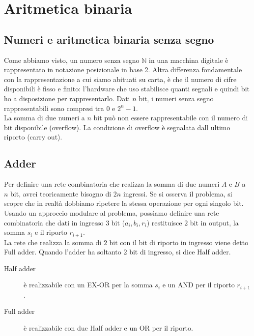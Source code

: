 \documentclass{article}
\begin{document}
\section{Aritmetica binaria}

\subsection{Numeri e aritmetica binaria senza segno}

Come abbiamo visto, un numero senza segno $\mathbb{N}$ in una macchina digitale è rappresentato in notazione posizionale in base 2.
Altra differenza fondamentale con la rappresentazione a cui siamo abituati su carta, è che il numero di cifre disponibili è fisso e finito:
l’hardware che uso stabilisce quanti segnali e quindi bit ho a disposizione per rappresentarlo.
Dati $n$ bit, i numeri senza segno rappresentabili sono compresi tra $0$ e $2^n - 1$.\\

\noindent
La somma di due numeri a $n$ bit può non essere rappresentabile con il numero di bit disponibile (overflow).
La condizione di overflow è segnalata dall ultimo riporto (carry out).

\subsection{Adder}

Per definire una rete combinatoria che realizza la somma di due numeri $A$ e $B$ a $n$ bit, avrei teoricamente bisogno di $2n$ ingressi.
Se si osserva il problema, si scopre che in realtà dobbiamo ripetere la stessa operazione per ogni singolo bit.
Usando un approccio modulare al problema, possiamo definire una rete combinatoria che dati in ingresso $3$ bit ($a_i, b_i, r_i$) restituisce $2$ bit in output, la somma $s_i$ e il riporto $r_{i+1}$.\\

\noindent
La rete che realizza la somma di $2$ bit con il bit di riporto in ingresso viene detto Full adder.
Quando l'adder ha soltanto $2$ bit di ingresso, si dice Half adder.

\begin{description}
    \item[Half adder] è realizzabile con un EX-OR per la somma $s_i$ e un AND per il riporto $r_{i+1}$.
    \item[Full adder] è realizzabile con due Half adder e un OR per il riporto.
\end{description}
\end{document}
